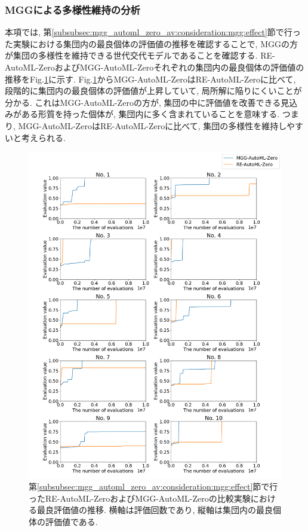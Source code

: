 \documentclass[11pt,oneside,openany,report]{jsbook}
\begin{document}
\subsubsection{MGGによる多様性維持の分析}\label{subsubsec:mgg_automl_zero_av:consideration:mgg:analysis}

本項では, 第\ref{subsubsec:mgg_automl_zero_av:consideration:mgg:effect}節で行った実験における集団内の最良個体の評価値の推移を確認することで, MGGの方が集団の多様性を維持できる世代交代モデルであることを確認する. RE-AutoML-ZeroおよびMGG-AutoML-Zeroそれぞれの集団内の最良個体の評価値の推移をFig.\ref{fig:fitness_re_vs_mgg}に示す. Fig.\ref{fig:fitness_re_vs_mgg}からMGG-AutoML-ZeroはRE-AutoML-Zeroに比べて, 段階的に集団内の最良個体の評価値が上昇していて, 局所解に陥りにくいことが分かる. これはMGG-AutoML-Zeroの方が, 集団の中に評価値を改善できる見込みがある形質を持った個体が, 集団内に多く含まれていることを意味する. つまり, MGG-AutoML-ZeroはRE-AutoML-Zeroに比べて, 集団の多様性を維持しやすいと考えられる.

\begin{figure}[tbp]
  \centering
  \includegraphics[width=14cm]{fitness_re_vs_mgg.png}
  \caption{第\ref{subsubsec:mgg_automl_zero_av:consideration:mgg:effect}節で行ったRE-AutoML-ZeroおよびMGG-AutoML-Zeroの比較実験における最良評価値の推移. 横軸は評価回数であり, 縦軸は集団内の最良個体の評価値である. }
  \label{fig:fitness_re_vs_mgg}
\end{figure}
\end{document}
